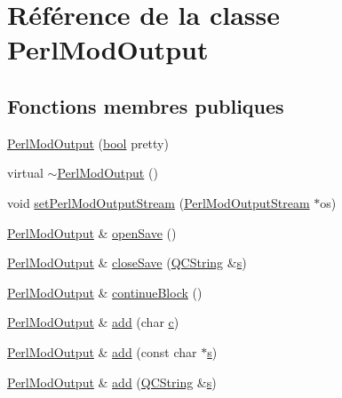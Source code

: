 \hypertarget{class_perl_mod_output}{}\section{Référence de la classe Perl\+Mod\+Output}
\label{class_perl_mod_output}
\subsection*{Fonctions membres publiques}
\begin{DoxyCompactItemize}
\item 
\hyperlink{class_perl_mod_output_a1a1ff2b3add5217939d7662474f59c57}{Perl\+Mod\+Output} (\hyperlink{qglobal_8h_a1062901a7428fdd9c7f180f5e01ea056}{bool} pretty)
\item 
virtual \hyperlink{class_perl_mod_output_a13afbda9147f3b59a75f004598ca68e1}{$\sim$\+Perl\+Mod\+Output} ()
\item 
void \hyperlink{class_perl_mod_output_ab7b0911db6dc14e1a4a12241484639d1}{set\+Perl\+Mod\+Output\+Stream} (\hyperlink{class_perl_mod_output_stream}{Perl\+Mod\+Output\+Stream} $\ast$os)
\item 
\hyperlink{class_perl_mod_output}{Perl\+Mod\+Output} \& \hyperlink{class_perl_mod_output_a859c8d77099503b70e3e5650b318db85}{open\+Save} ()
\item 
\hyperlink{class_perl_mod_output}{Perl\+Mod\+Output} \& \hyperlink{class_perl_mod_output_ae4e38b160261592855849e74361bb189}{close\+Save} (\hyperlink{class_q_c_string}{Q\+C\+String} \&\hyperlink{060__command__switch_8tcl_a011c73f2dbb87635a3b4206c72355f6e}{s})
\item 
\hyperlink{class_perl_mod_output}{Perl\+Mod\+Output} \& \hyperlink{class_perl_mod_output_ab38458a29d71feb99a35e4437f7ded42}{continue\+Block} ()
\item 
\hyperlink{class_perl_mod_output}{Perl\+Mod\+Output} \& \hyperlink{class_perl_mod_output_ae8922b7e8560f4e86849f5bb1bf3a0fd}{add} (char \hyperlink{060__command__switch_8tcl_ab14f56bc3bd7680490ece4ad7815465f}{c})
\item 
\hyperlink{class_perl_mod_output}{Perl\+Mod\+Output} \& \hyperlink{class_perl_mod_output_ac88b0e912b838cf4e3ae64038fa46201}{add} (const char $\ast$\hyperlink{060__command__switch_8tcl_a011c73f2dbb87635a3b4206c72355f6e}{s})
\item 
\hyperlink{class_perl_mod_output}{Perl\+Mod\+Output} \& \hyperlink{class_perl_mod_output_a1751b1bc64d228181dc903bfb91a4f84}{add} (\hyperlink{class_q_c_string}{Q\+C\+String} \&\hyperlink{060__command__switch_8tcl_a011c73f2dbb87635a3b4206c72355f6e}{s})

\end{DoxyCompactItemize}
